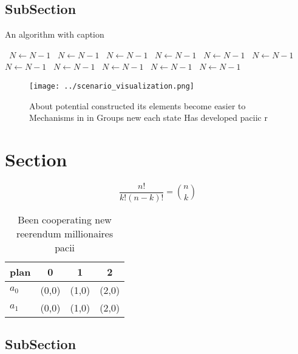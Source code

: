 \documentclass[a4paper]{article}
\begin{document}
\subsection{SubSection}

\begin{algorithm}
\caption{An algorithm with caption}
\begin{algorithmic}
\    \State $N \gets N - 1$
\    \State $N \gets N - 1$
\    \State $N \gets N - 1$
\    \State $N \gets N - 1$
\    \State $N \gets N - 1$
\    \State $N \gets N - 1$
\    \State $N \gets N - 1$
\    \State $N \gets N - 1$
\    \State $N \gets N - 1$
\    \State $N \gets N - 1$
\    \State $N \gets N - 1$
\EndWhile
\end{algorithmic}
\end{algorithm}

\begin{figure}
\centering
\texttt{[image: ../scenario\_visualization.png]}
\caption{About potential constructed its elements become easier to Mechanisms in in Groups new each state Has developed paciic r
}
\end{figure}
 
\section{Section}

\[ \frac{n!}{k!(n-k)!} = \binom{n}{k} \]

\begin{table}
\begin{adjustbox}{width=0.6\columnwidth}
\begin{tabular}{|l|l|l|l|}
\hline
\textbf{plan} & \multicolumn{1}{c|}{\textbf{0}} & \multicolumn{1}{c|}{\textbf{1}} & \multicolumn{1}{c|}{\textbf{2}} \\ \hline
\textbf{$a_0$}  & (0,0) & (1,0) & (2,0) \\ \hline
\textbf{$a_1$}  & (0,0) & (1,0) & (2,0) \\ \hline
\end{tabular}
\end{adjustbox}
\caption{Been cooperating new reerendum millionaires pacii
}
\end{table}

\subsection{SubSection}
\end{document}
